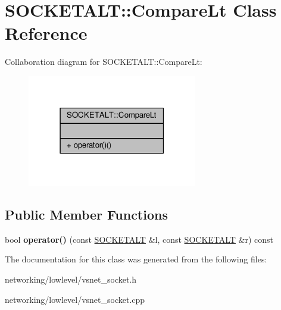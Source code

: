 \hypertarget{classSOCKETALT_1_1CompareLt}{}\section{S\+O\+C\+K\+E\+T\+A\+LT\+:\+:Compare\+Lt Class Reference}
\label{classSOCKETALT_1_1CompareLt}


Collaboration diagram for S\+O\+C\+K\+E\+T\+A\+LT\+:\+:Compare\+Lt\+:
\nopagebreak
\begin{figure}[H]
\begin{center}
\leavevmode
\includegraphics[width=210pt]{d6/dde/classSOCKETALT_1_1CompareLt__coll__graph}
\end{center}
\end{figure}
\subsection*{Public Member Functions}
\begin{DoxyCompactItemize}
\item 
bool {\bfseries operator()} (const \hyperlink{classSOCKETALT}{S\+O\+C\+K\+E\+T\+A\+LT} \&l, const \hyperlink{classSOCKETALT}{S\+O\+C\+K\+E\+T\+A\+LT} \&r) const \hypertarget{classSOCKETALT_1_1CompareLt_a31068bfd2092c3c4fd438a77d532b14c}{}\label{classSOCKETALT_1_1CompareLt_a31068bfd2092c3c4fd438a77d532b14c}

\end{DoxyCompactItemize}


The documentation for this class was generated from the following files\+:\begin{DoxyCompactItemize}
\item 
networking/lowlevel/vsnet\+\_\+socket.\+h\item 
networking/lowlevel/vsnet\+\_\+socket.\+cpp\end{DoxyCompactItemize}
